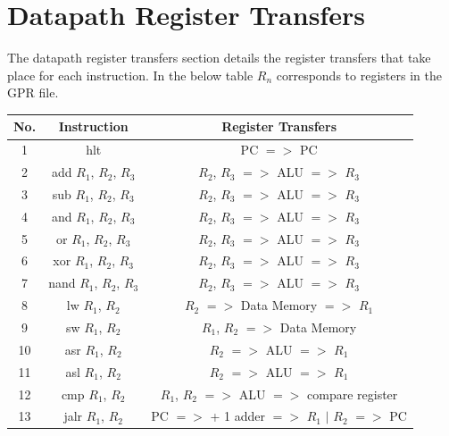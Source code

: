 \documentclass{article}
\begin{document}
\newpage

\section{Datapath Register Transfers}
\label{drt}
\begin{par}
	
	The datapath register transfers section details the register transfers that take place for each instruction. In the below table $ R_{n} $ corresponds to registers in the GPR file. 
	
	\begin{center}
		\begin{tabular}{|c|c|c|}
			\hline
			\textbf{No.} & \textbf{Instruction} & \textbf{Register Transfers} \\
			\hline 
			1 & hlt & PC $ => $ PC \\
			\hline 
			2 & add $ R_{1} $, $ R_{2} $, $ R_{3} $ & $ R_{2} $, $ R_{3} $ $ => $ ALU $ => $ $ R_{3} $ \\
			\hline
			3 & sub $ R_{1} $, $ R_{2} $, $ R_{3} $ & $ R_{2} $, $ R_{3} $ $ => $ ALU $ => $ $ R_{3} $ \\
			\hline
			4 & and $ R_{1} $, $ R_{2} $, $ R_{3} $ & $ R_{2} $, $ R_{3} $ $ => $ ALU $ => $ $ R_{3} $ \\
			\hline
			5 & or $ R_{1} $, $ R_{2} $, $ R_{3} $ & $ R_{2} $, $ R_{3} $ $ => $ ALU $ => $ $ R_{3} $ \\
			\hline
			6 & xor $ R_{1} $, $ R_{2} $, $ R_{3} $ & $ R_{2} $, $ R_{3} $ $ => $ ALU $ => $ $ R_{3} $ \\
			\hline
			7 & nand $ R_{1} $, $ R_{2} $, $ R_{3} $ & $ R_{2} $, $ R_{3} $ $ => $ ALU $ => $ $ R_{3} $ \\
			\hline
			8 & lw $ R_{1} $, $ R_{2} $ & $ R_{2} $ $ => $ Data Memory $ => $ $ R_{1} $ \\
			\hline
			9 & sw $ R_{1} $, $ R_{2} $ & $ R_{1} $, $ R_{2} $ $ => $ Data Memory \\
			\hline
			10 & asr $ R_{1} $, $ R_{2} $ & $ R_{2} $ $ => $ ALU $ => $ $ R_{1} $ \\
			\hline
			11 & asl $ R_{1} $, $ R_{2} $ & $ R_{2} $ $ => $ ALU $ => $ $ R_{1} $ \\
			\hline
			12 & cmp $ R_{1} $, $ R_{2} $ & $ R_{1} $, $ R_{2} $ $ => $ ALU $ => $ compare register \\
			\hline
			13 & jalr $ R_{1} $, $ R_{2} $ & PC $ => $ + 1 adder $ => $ $ R_{1} $ $ | $ $ R_{2} $ $ => $ PC \\
			\hline

\end{tabular}
\end{center}
\end{par}
\end{document}
